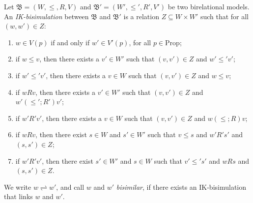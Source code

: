 \documentclass[submission,copyright,creativecommons]{eptcs}
\newcommand{\mo}{\mathfrak}
\newcommand{\B}{\mo{B}}
\newcommand{\Zin}[2]{(#1,#2)\in Z}
\newcommand{\Z}{Z}
\newcommand{\ac}{R}
\newcommand{\myitem}[1]{
  \renewcommand{\labelenumi}{(\theenumi) }
  \renewcommand{\theenumi}{#1}
  \item
}
\newcommand{\bisim}{\rightleftharpoons}
\newcommand{\Prop}{\mathrm{Prop}}
\begin{document}
\begin{definition}
  Let $\B = (W, \leq, \ac, V)$ and $\B' = (W', \leq', \ac', V')$ be two
  birelational models. An \emph{IK-bi\-si\-mu\-la\-tion} between $\B$ and $\B'$ is a
  relation $\Z \subseteq W \times W'$ such that for all $\Zin{w}{w'}$:
  \begin{enumerate}
    \myitem{$\Z_p$} \label{it:sim-prop}
             $w \in V(p)$ if and only if $w' \in V'(p)$,
            for all $p\in\Prop$;
    \myitem{$\Z^1_\leq$} \label{it:sim-imp-1}
            if $w \leq v$, then there exists a $v'\in W'$ such that
            $\Zin{v}{v'}$ and $w' \leq' v'$;
    \myitem{$\Z^2_\leq$} \label{it:sim-imp-2}
            if $w' \leq' v'$, then there exists a $v\in W$ such that
            $\Zin{v}{v'}$ and $w \leq v$;
      \myitem{$\Z^1_\Box$} \label{it:sim-box-1}
              if $w \ac v$, then there exists a $v'\in W'$ such
              that $\Zin{v}{v'}$ and $w' ({\leq'} \mathrel{;} {\ac'}) v'$;
      \myitem{$\Z^2_\Box$} \label{it:sim-box-2}
              if $w' \ac' v'$, then there exists a $v\in W$ such
              that $\Zin{v}{v'}$ and $w ({\leq} \mathrel{;} {\ac}) v$;
      \myitem{$\Z^1_\Diamond$} \label{it:sim-diamond-1}
              if $wRv$, then there exist $s \in W$ and $s' \in W'$ such that
              $v \leq s$ and $w' \ac' s'$ and $\Zin{s}{s'}$;
      \myitem{$\Z^2_\Diamond$} \label{it:sim-diamond-2}
              if $w'R'v'$, then there exist $s' \in W'$ and $s \in W$ such that
              $v' \leq' s'$ and $w \ac s$ and $\Zin{s}{s'}$.
  \end{enumerate}
  We write $w \bisim w'$, and call $w$ and $w'$ \emph{bisimilar},
  if there exists an IK-bisimulation that links $w$ and $w'$.
\end{definition}
\end{document}
